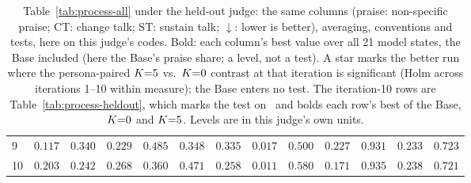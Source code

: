 \begin{table}[t]
\begin{tabular}{@{}lrrrrrrrrrrrr@{}}
9 & $0.117$\rlap{$^{*}$} & $\mathbf{0.340}$\rlap{$^{*}$} & $0.229$ & $\mathbf{0.485}$\rlap{$^{*}$} & $0.348$ & $\mathbf{0.335}$\rlap{$^{*}$} & $0.017$\rlap{$^{*}$} & $0.500$ & $\mathbf{0.227}$\rlap{$^{*}$} & $0.931$\rlap{$^{*}$} & $0.233$\rlap{$^{*}$} & $\mathbf{0.723}$\rlap{$^{*}$}\\
10 & $0.203$\rlap{$^{*}$} & $0.242$\rlap{$^{*}$} & $0.268$ & $0.360$\rlap{$^{*}$} & $0.471$\rlap{$^{*}$} & $0.258$\rlap{$^{*}$} & $0.011$\rlap{$^{*}$} & $0.580$ & $0.171$\rlap{$^{*}$} & $0.935$\rlap{$^{*}$} & $\mathbf{0.238}$ & $0.721$\rlap{$^{*}$}\\
\bottomrule
\end{tabular}
\caption{Table~\ref{tab:process-all} under the held-out judge: the same columns (praise:
non-specific praise; CT: change talk; ST: sustain talk; $\downarrow$: lower is better), averaging,
conventions and tests, here on this judge's codes. Bold: each column's best value over all 21 model
states, the Base included (here the Base's praise share; a level, not a test). A star marks the
better run where the persona-paired $K{=}5$ vs.\ $K{=}0$ contrast at that iteration is significant
(Holm across iterations 1--10 within measure); the Base enters no test. The iteration-10 rows are
Table~\ref{tab:process-heldout}, which marks the test on \dz\ and bolds each row's best of the
Base, $K{=}0$ and $K{=}5$. Levels are in this judge's own units.}
\label{tab:process-all-heldout}
\end{table}
